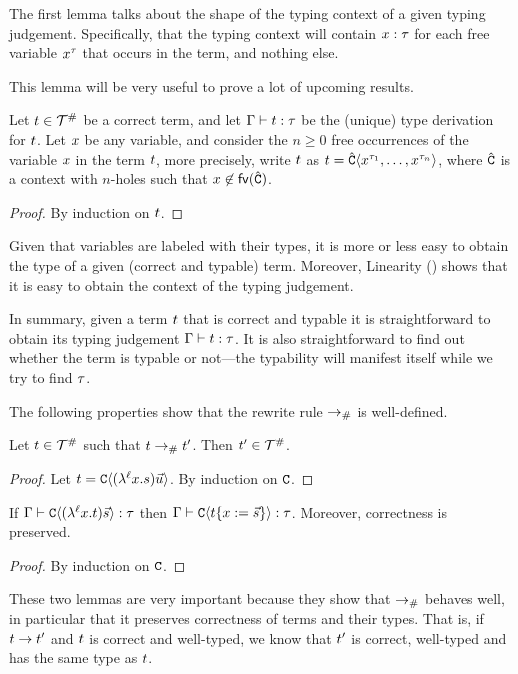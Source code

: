 
The first lemma talks about the shape of the typing context of a given typing judgement.
Specifically, that the typing context will contain $x : \tau$ for each free variable
$x^\tau$ that occurs in the term, and nothing else.

This lemma will be very useful to prove a lot of upcoming results.

\begin{lemma}[Linearity]
Let $t \in \mathcal{T}^{\mathtt{\#}}$ be a correct term,
and let $\Gamma \vdash t : \tau$ be the (unique) type derivation for $t$.
Let $x$ be any variable,
and consider the $n \geq 0$ free occurrences of the variable $x$ in the term $t$,
more precisely, write $t$ as $t = \hat{\mathtt{C}}\langle x^{\tau_1},\hdots,x^{\tau_n}\rangle$,
where $\hat{\mathtt{C}}$ is a context with $n$-holes such that $x \not\in \mathsf{fv}({\hat{\mathtt{C}}})$.
\end{lemma}
\begin{proof}
By induction on $t$.
\end{proof}


\begin{remark}
  Given that variables are labeled with their types, it is more or less easy to obtain
  the type of a given (correct and typable) term.
  Moreover, Linearity () shows that it is easy to obtain the context of the typing judgement.

  In summary, given a term $t$ that is correct and typable
  it is straightforward to obtain its typing judgement
  $\Gamma \vdash t : \tau$.
  It is also straightforward to find out whether the term is typable or not---the
  typability will manifest itself while we try to find $\tau$.
\end{remark}



The following properties show that the rewrite rule $\mathrel{\to_{\mathtt{\#}}}$ is well-defined.

\begin{lemma}
Let $t \in \mathcal{T}^{\mathtt{\#}}$ such that $t \mathrel{\to_{\mathtt{\#}}} t'$. Then $t' \in \mathcal{T}^{\mathtt{\#}}$.
\end{lemma}
\begin{proof}
Let $t = \mathtt{C}\langle(\lambda^{\ell} x. s) \vec{u}\rangle$. By induction on $\mathtt{C}$.
\end{proof}


\begin{lemma}
If $\Gamma \vdash \mathtt{C}\langle(\lambda^{\ell} x. t) \vec{s}\rangle : \tau$
then $\Gamma \vdash \mathtt{C}\langle t\{x := \vec{s}\}\rangle : \tau$.
Moreover, correctness is preserved.
\end{lemma}
\begin{proof}
 By induction on $\mathtt{C}$.
\end{proof}

These two lemmas are very important because they show that $\mathrel{\to_{\mathtt{\#}}}$ behaves
well, in particular that it preserves correctness of terms and their types.
That is, if $t \to t'$ and $t$ is correct and well-typed,
we know that $t'$ is correct, well-typed and has the same type as $t$.

